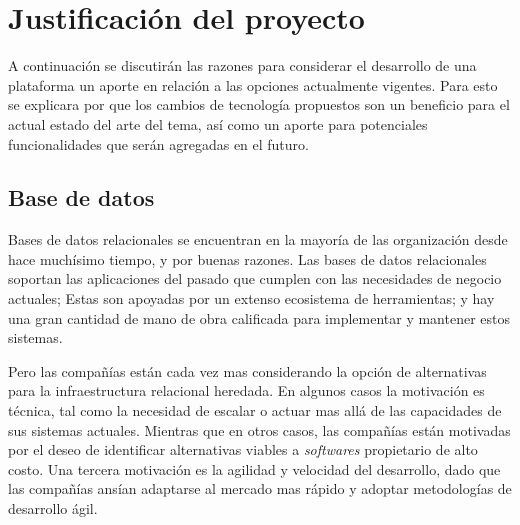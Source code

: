 
\chapter{Justificación del proyecto}\label{cap:justificacion_proyecto}


A continuación se discutirán las razones para considerar el desarrollo de una plataforma \ecommerce un aporte en relación a las opciones \opensource actualmente vigentes. Para esto se explicara por que los cambios de tecnología propuestos son un beneficio para el actual estado del arte del tema, así como un aporte para potenciales funcionalidades que serán agregadas en el futuro.


\section{Base de datos}

Bases de datos relacionales se encuentran en la mayoría de las organización desde hace muchísimo tiempo, y por buenas razones. Las bases de datos relacionales soportan las aplicaciones del pasado que cumplen con las necesidades de negocio actuales; Estas son apoyadas por un extenso ecosistema de herramientas; y hay una gran cantidad de mano de obra calificada para implementar y mantener estos sistemas.

Pero las compañías están cada vez mas considerando la opción de alternativas para la infraestructura relacional heredada. En algunos casos la motivación es técnica, tal como la necesidad de escalar o actuar mas allá de las capacidades de sus sistemas actuales. Mientras que en otros casos, las compañías están motivadas por el deseo de identificar alternativas viables a \textit{softwares} propietario de alto costo. Una tercera motivación es la agilidad y velocidad del desarrollo, dado que las compañías ansían adaptarse al mercado mas rápido y adoptar metodologías de desarrollo ágil.



